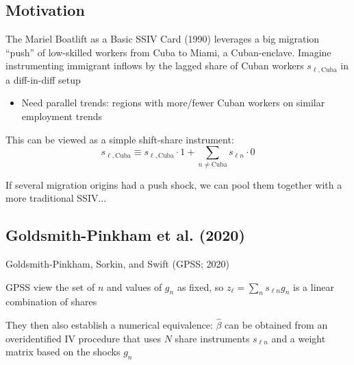 \documentclass[t]{beamer}
\begin{document}
\subsection{Motivation}

\begin{frame}{The Mariel Boatlift as a Basic SSIV}
Card (1990) leverages a big migration ``push'' of low-skilled workers from Cuba to Miami, a Cuban-enclave. \pause 
Imagine instrumenting immigrant inflows by the lagged share of Cuban workers $s_{\ell, \text{Cuba}}$ in a diff-in-diff setup
\begin{itemize}
	\item Need parallel trends: regions with more/fewer Cuban workers on similar employment trends
\end{itemize}	

This can be viewed as a simple shift-share instrument: 
\vspace{-4mm}
$$s_{\ell, \text{Cuba}}\equiv s_{\ell,\text{Cuba}}\cdot 1+\sum_{n\ne\text{Cuba}} s_{\ell n}\cdot 0$$
\vspace{-6mm}\pause

If several migration origins had a push shock, we can pool them together with a more traditional SSIV...

\end{frame}

\subsection{Goldsmith-Pinkham et al. (2020)}

\begin{frame}{Goldsmith-Pinkham, Sorkin, and Swift (GPSS; 2020)} 

 GPSS view the set of $n$ and values of $g_n$ as fixed, so $z_\ell=\sum_n s_{\ell n} g_n$ is a linear combination of shares
\medskip\pause

They then also establish a numerical equivalence:
$\hat{\beta}$ can be obtained from an overidentified IV procedure that uses $N$ share instruments $s_{\ell n}$ and a weight matrix based on the shocks $g_n$



\end{frame}
\end{document}
